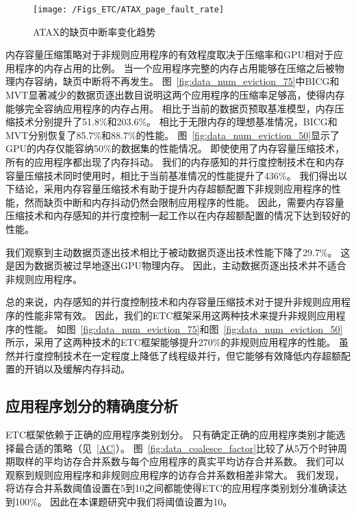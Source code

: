 \begin{figure}[htbp] %
  \centering
  \texttt{[image: /Figs\_ETC/ATAX\_page\_fault\_rate]}
  \caption{ATAX的缺页中断率变化趋势}
  \label{fig:ATAX_page_fault_rate}
\end{figure}


内存容量压缩策略对于非规则应用程序的有效程度取决于压缩率和GPU相对于应用程序的内存占用的比例。
当一个应用程序完整的内存占用能够在压缩之后被物理内存容纳，缺页中断将不再发生。
图~\ref{fig:data_num_eviction_75}中BICG和MVT显著减少的数据页逐出数目说明这两个应用程序的压缩率足够高，使得内存能够完全容纳应用程序的内存占用。
相比于当前的数据页预取基准模型，内存压缩技术分别提升了51.8\%和203.6\%。
相比于无限内存的理想基准情况，BICG和MVT分别恢复了85.7\%和88.7\%的性能。
图~\ref{fig:data_num_eviction_50}显示了GPU的内存仅能容纳50\%的数据集的性能情况。
即使使用了内存容量压缩技术，所有的应用程序都出现了内存抖动。
我们的内存感知的并行度控制技术在和内存容量压缩技术同时使用时，相比于当前基准情况的性能提升了436\%。
我们得出以下结论，采用内存容量压缩技术有助于提升内存超额配置下非规则应用程序的性能，然而缺页中断和内存抖动仍然会限制应用程序的性能。
因此，需要内存容量压缩技术和内存感知的并行度控制一起工作以在内存超额配置的情况下达到较好的性能。

我们观察到主动数据页逐出技术相比于被动数据页逐出技术性能下降了29.7\%。
这是因为数据页被过早地逐出GPU物理内存。
因此，主动数据页逐出技术并不适合非规则应用程序。

总的来说，内存感知的并行度控制技术和内存容量压缩技术对于提升非规则应用程序的性能非常有效。
因此，我们的ETC框架采用这两种技术来提升非规则应用程序的性能。
如图~\ref{fig:data_num_eviction_75}和图~\ref{fig:data_num_eviction_50}所示，采用了这两种技术的ETC框架能够提升270\%的非规则应用程序的性能。
虽然并行度控制技术在一定程度上降低了线程级并行，但它能够有效降低内存超额配置的开销以及缓解内存抖动。

\subsection{应用程序划分的精确度分析}
ETC框架依赖于正确的应用程序类别划分。
只有确定正确的应用程序类别才能选择最合适的策略（见~\ref{AC}）。
图~\ref{fig:data_coalesce_factor}比较了从5万个时钟周期取样的平均访存合并系数与每个应用程序的真实平均访存合并系数。
我们可以观察到规则应用程序和非规则应用程序的访存合并系数相差非常大。
我们发现，将访存合并系数阈值设置在5到10之间都能使得ETC的应用程序类别划分准确读达到100\%。
因此在本课题研究中我们将阈值设置为10。

